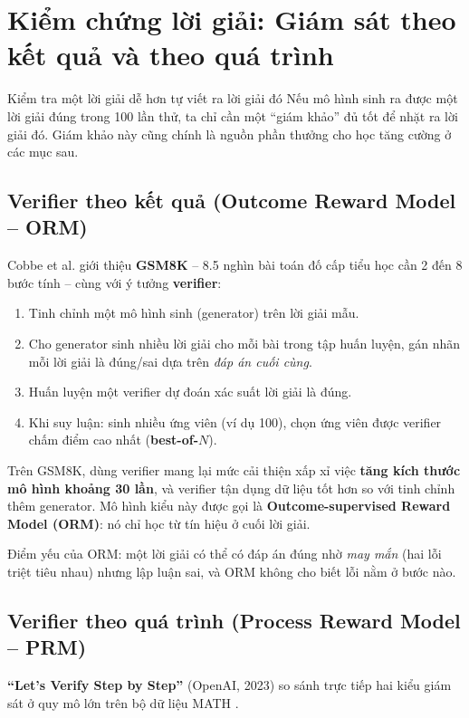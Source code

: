 
\section{Kiểm chứng lời giải: Giám sát theo kết quả và theo quá trình}
\label{sec:verifiers}

\begin{keyidea}{Kiểm tra một lời giải dễ hơn tự viết ra lời giải đó}
Nếu mô hình sinh ra được một lời giải đúng trong 100 lần thử, ta chỉ cần một “giám khảo” đủ tốt để nhặt ra lời giải đó. Giám khảo này cũng chính là nguồn phần thưởng cho học tăng cường ở các mục sau.
\end{keyidea}

\subsection{Verifier theo kết quả (Outcome Reward Model -- ORM)}
\label{ssec:orm}
Cobbe et al. \cite{cobbe2021gsm8k} giới thiệu \textbf{GSM8K} -- 8.5 nghìn bài toán đố cấp tiểu học cần 2 đến 8 bước tính -- cùng với ý tưởng \textbf{verifier}:
\begin{enumerate}
	\item Tinh chỉnh một mô hình sinh (generator) trên lời giải mẫu.
	\item Cho generator sinh nhiều lời giải cho mỗi bài trong tập huấn luyện, gán nhãn mỗi lời giải là đúng/sai dựa trên \emph{đáp án cuối cùng}.
	\item Huấn luyện một verifier dự đoán xác suất lời giải là đúng.
	\item Khi suy luận: sinh nhiều ứng viên (ví dụ 100), chọn ứng viên được verifier chấm điểm cao nhất (\textbf{best-of-$N$}).
\end{enumerate}
Trên GSM8K, dùng verifier mang lại mức cải thiện xấp xỉ việc \textbf{tăng kích thước mô hình khoảng 30 lần}, và verifier tận dụng dữ liệu tốt hơn so với tinh chỉnh thêm generator. Mô hình kiểu này được gọi là \textbf{Outcome-supervised Reward Model (ORM)}: nó chỉ học từ tín hiệu ở cuối lời giải.

Điểm yếu của ORM: một lời giải có thể có đáp án đúng nhờ \emph{may mắn} (hai lỗi triệt tiêu nhau) nhưng lập luận sai, và ORM không cho biết lỗi nằm ở bước nào.

\subsection{Verifier theo quá trình (Process Reward Model -- PRM)}
\label{ssec:prm}
\textbf{“Let's Verify Step by Step”} \cite{lightman2024verify} (OpenAI, 2023) so sánh trực tiếp hai kiểu giám sát ở quy mô lớn trên bộ dữ liệu MATH \cite{hendrycks2021math}.

